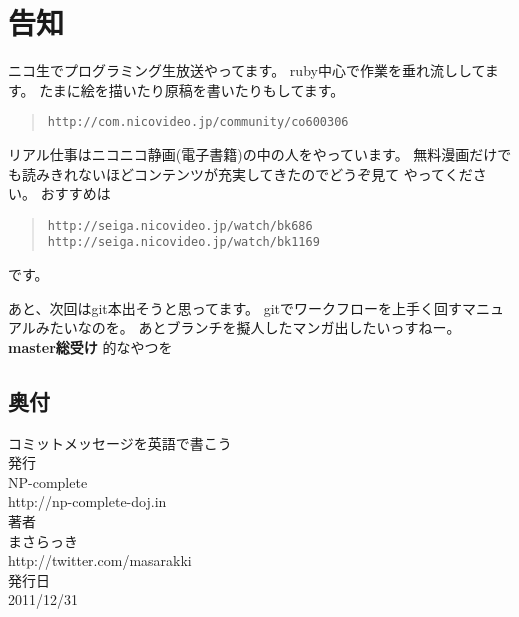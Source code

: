 \documentclass{jarticle}
\begin{document}
  \newpage
  \section*{告知}
  ニコ生でプログラミング生放送やってます。
  ruby中心で作業を垂れ流ししてます。
  たまに絵を描いたり原稿を書いたりもしてます。
  \begin{quote}
   {\tt http://com.nicovideo.jp/community/co600306}
  \end{quote}

  リアル仕事はニコニコ静画(電子書籍)の中の人をやっています。
  無料漫画だけでも読みきれないほどコンテンツが充実してきたのでどうぞ見て
  やってください。
  おすすめは
  \begin{quote}
   {\tt http://seiga.nicovideo.jp/watch/bk686}\\
   {\tt http://seiga.nicovideo.jp/watch/bk1169}
  \end{quote}
  です。

  あと、次回はgit本出そうと思ってます。
  gitでワークフローを上手く回すマニュアルみたいなのを。
  あとブランチを擬人したマンガ出したいっすねー。
   \huge{{\bf  master総受け}}
   \normalsize{的なやつを}

  \newpage
  \begin{center}
   \Large
   \section*{奥付}
   {\huge コミットメッセージを英語で書こう}
   \\[2.0cm]
   発行\\
   NP-complete\\
   http://np-complete-doj.in
   \\[1.5cm]
   著者\\
   まさらっき\\
   http://twitter.com/masarakki
   \\[2.5cm]
   発行日\\
   2011/12/31
  \end{center}
  \newpage
  \thispagestyle{empty}
  \-
  \newpage
  \begin{flushright}
   \-
  \end{flushright}

  \thispagestyle{empty}
\end{document}
